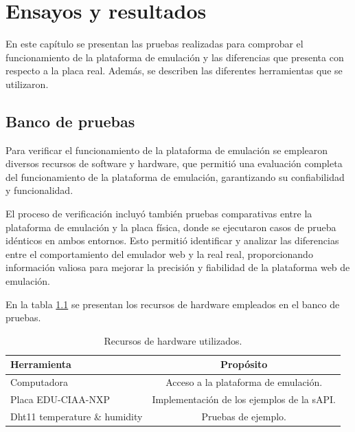 
\chapter{Ensayos y resultados} %

\label{Chapter4} %

En este capítulo se presentan las pruebas realizadas para comprobar el funcionamiento de la plataforma de emulación y las diferencias que presenta con respecto a la placa real. Además, se describen las diferentes herramientas que se utilizaron.

\section{Banco de pruebas}

Para verificar el funcionamiento de la plataforma de emulación se emplearon diversos recursos de software y hardware, que permitió una evaluación completa del funcionamiento de la plataforma de emulación, garantizando su confiabilidad y funcionalidad. 

El proceso de verificación incluyó también pruebas comparativas entre la plataforma de emulación y la placa física, donde se ejecutaron casos de prueba idénticos en ambos entornos. Esto permitió identificar y analizar las diferencias entre el comportamiento del emulador web y la real real, proporcionando información valiosa para mejorar la precisión y fiabilidad de la plataforma web de emulación.



En la tabla \ref{tab:RecursosHardware} se presentan los recursos de hardware empleados en el banco de pruebas.

\begin{table}[h]
	\centering
	\caption[Recursos de hardware utilizados]{Recursos de hardware utilizados.}
	\begin{tabular}{l c}    
		\toprule
		\textbf{Herramienta} & \textbf{Propósito}\\
		\midrule
		Computadora & Acceso a la plataforma de emulación.\\		
		Placa EDU-CIAA-NXP &  Implementación de los ejemplos de la sAPI.\\
		Dht11 temperature \& humidity  &  Pruebas de ejemplo.\\
		\bottomrule
		\hline
	\end{tabular}
	\label{tab:RecursosHardware}
\end{table}


